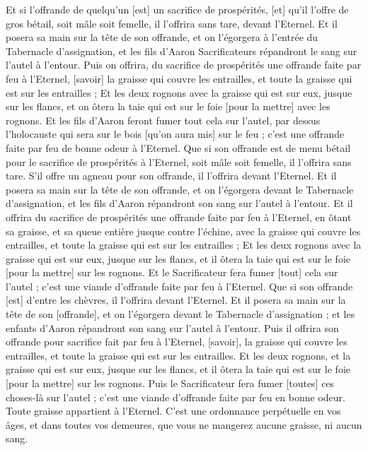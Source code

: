 \begin{multicols}{2}
\VerseOne{}Et si l'offrande de quelqu'un [est] un sacrifice de prospérités, [et] qu'il l'offre de gros bétail, soit mâle soit femelle, il l'offrira sans tare, devant l'Eternel.
Et il posera sa main sur la tête de son offrande, et on l'égorgera à l'entrée du Tabernacle d'assignation, et les fils d'Aaron Sacrificateurs répandront le sang sur l'autel à l'entour.
Puis on offrira, du sacrifice de prospérités une offrande faite par feu à l'Eternel, [savoir] la graisse qui couvre les entrailles, et toute la graisse qui est sur les entrailles ;
Et les deux rognons avec la graisse qui est sur eux, jusque sur les flancs, et on ôtera la taie qui est sur le foie [pour la mettre] avec les rognons.
Et les fils d'Aaron feront fumer tout cela sur l'autel, par dessus l'holocauste qui sera sur le bois [qu'on aura mis] sur le feu ; c'est une offrande faite par feu de bonne odeur à l'Eternel.
Que si son offrande est de menu bétail pour le sacrifice de prospérités à l'Eternel, soit mâle soit femelle, il l'offrira sans tare.
S'il offre un agneau pour son offrande, il l'offrira devant l'Eternel.
Et il posera sa main sur la tête de son offrande, et on l'égorgera devant le Tabernacle d'assignation, et les fils d'Aaron répandront son sang sur l'autel à l'entour.
Et il offrira du sacrifice de prospérités une offrande faite par feu à l'Eternel, en ôtant sa graisse, et sa queue entière jusque contre l'échine, avec la graisse qui couvre les entrailles, et toute la graisse qui est sur les entrailles ;
Et les deux rognons avec la graisse qui est sur eux, jusque sur les flancs, et il ôtera la taie qui est sur le foie [pour la mettre] sur les rognons.
Et le Sacrificateur fera fumer [tout] cela sur l'autel ; c'est une viande d'offrande faite par feu à l'Eternel.
Que si son offrande [est] d'entre les chèvres, il l'offrira devant l'Eternel.
Et il posera sa main sur la tête de son [offrande], et on l'égorgera devant le Tabernacle d'assignation ; et les enfants d'Aaron répandront son sang sur l'autel à l'entour.
Puis il offrira son offrande pour sacrifice fait par feu à l'Eternel, [savoir], la graisse qui couvre les entrailles, et toute la graisse qui est sur les entrailles.
Et les deux rognons, et la graisse qui est sur eux, jusque sur les flancs, et il ôtera la taie qui est sur le foie [pour la mettre] sur les rognons.
Puis le Sacrificateur fera fumer [toutes] ces choses-là sur l'autel ; c'est une viande d'offrande faite par feu en bonne odeur. Toute graisse appartient à l'Eternel.
C'est une ordonnance perpétuelle en vos âges, et dans toutes vos demeures, que vous ne mangerez aucune graisse, ni aucun sang.

\end{multicols}
